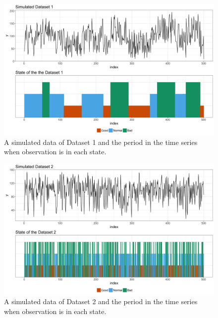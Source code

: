 \documentclass{beamer}
\begin{document}
\begin{frame}

\begin{figure}
\includegraphics[width=1\linewidth]{sim1}
\caption{A simulated data of Dataset 1 and the period in the time series when observation is in each state.}
\end{figure}

\end{frame}

\begin{frame}

\begin{figure}
\includegraphics[width=1\linewidth]{sim2}
\caption{A simulated data of Dataset 2 and the period in the time series when observation is in each state.}
\end{figure}

\end{frame}
\end{document}
